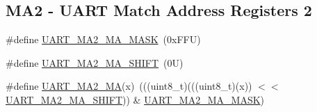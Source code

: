 \subsection*{M\+A2 -\/ U\+A\+RT Match Address Registers 2}
\begin{DoxyCompactItemize}
\item 
\#define \mbox{\hyperlink{group___u_a_r_t___register___masks_ga700f51ab869350daee42b8ae9c655ffd}{U\+A\+R\+T\+\_\+\+M\+A2\+\_\+\+M\+A\+\_\+\+M\+A\+SK}}~(0x\+F\+F\+U)
\item 
\#define \mbox{\hyperlink{group___u_a_r_t___register___masks_ga1ecfe245065ed459b087fc0d629b3f07}{U\+A\+R\+T\+\_\+\+M\+A2\+\_\+\+M\+A\+\_\+\+S\+H\+I\+FT}}~(0\+U)
\item 
\#define \mbox{\hyperlink{group___u_a_r_t___register___masks_gaf2427a2534075e01475f46219e742b00}{U\+A\+R\+T\+\_\+\+M\+A2\+\_\+\+MA}}(x)~(((uint8\+\_\+t)(((uint8\+\_\+t)(x)) $<$$<$ \mbox{\hyperlink{group___u_a_r_t___register___masks_ga1ecfe245065ed459b087fc0d629b3f07}{U\+A\+R\+T\+\_\+\+M\+A2\+\_\+\+M\+A\+\_\+\+S\+H\+I\+FT}})) \& \mbox{\hyperlink{group___u_a_r_t___register___masks_ga700f51ab869350daee42b8ae9c655ffd}{U\+A\+R\+T\+\_\+\+M\+A2\+\_\+\+M\+A\+\_\+\+M\+A\+SK}})
\end{DoxyCompactItemize}
